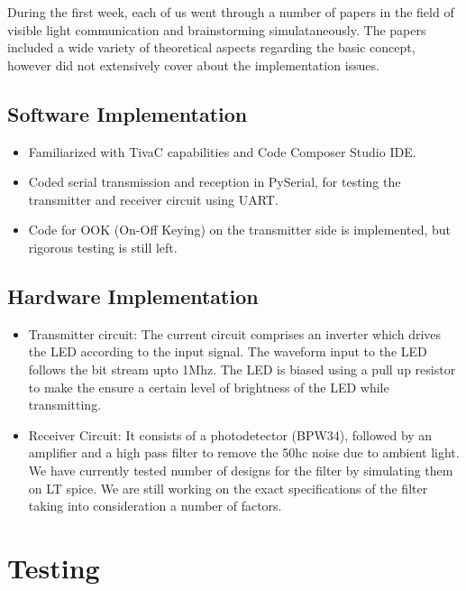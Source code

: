 \documentclass{article}
\begin{document}
During the first week, each of us went through a number of papers in the field of visible light communication and brainstorming simulataneously. The papers included a wide variety of theoretical aspects regarding the basic concept, however did not extensively cover about the implementation issues. 

\subsection{Software Implementation}
\begin{itemize}
\item Familiarized with TivaC capabilities and Code Composer Studio IDE.
\item Coded serial transmission and reception in PySerial, for testing the transmitter and receiver circuit using UART.
\item Code for OOK (On-Off Keying) on the transmitter side is implemented, but rigorous testing is still left.
\end{itemize}

\subsection{Hardware Implementation}
\begin{itemize}
\item Transmitter circuit: The current circuit comprises an inverter which drives the LED according to the input signal. The waveform input to the LED follows the bit stream upto 1Mhz. The LED is biased using a pull up resistor to make the ensure a certain level of brightness of the LED while transmitting. \\
\item Receiver Circuit: It consists of a photodetector (BPW34), followed by an amplifier and a high pass filter to remove the 50hc noise due to ambient light. We have currently tested number of designs for the filter by simulating them on LT spice. We are still working on the exact specifications of the filter taking into consideration a number of factors.%
\end{itemize}

\section{Testing}
\end{document}
